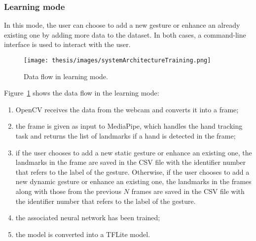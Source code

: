 \documentclass[../thesis.tex]{subfiles}
\begin{document}
\subsubsection{Learning mode}
In this mode, the user can choose to add a new gesture or enhance an already existing one by adding more data to the dataset. In both cases, a command-line interface is used to interact with the user.
\begin{figure}[H]
    \centering
    \texttt{[image: thesis/images/systemArchitectureTraining.png]}
    \caption{Data flow in learning mode.}
    \label{fig:system_architecture_learning}
\end{figure}
Figure~\ref{fig:system_architecture_learning} shows the data flow in the learning mode:
\begin{enumerate}
    \item OpenCV receives the data from the webcam and converts it into a frame;
    \item the frame is given as input to MediaPipe, which handles the hand tracking task and returns the list of landmarks if a hand is detected in the frame;
    \item if the user chooses to add a new static gesture or enhance an existing one, the landmarks in the frame are saved in the CSV file with the identifier number that refers to the label of the gesture. Otherwise, if the user chooses to add a new dynamic gesture or enhance an existing one, the landmarks in the frames along with those from the previous $N$ frames are saved in the CSV file with the identifier number that refers to the label of the gesture.
    \item the associated neural network has been trained;
    \item the model is converted into a TFLite model.
\end{enumerate}
\end{document}
